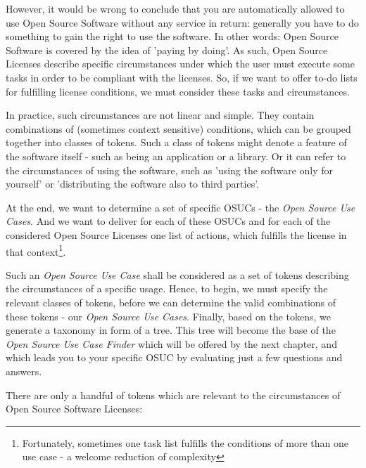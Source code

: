 However, it would be wrong to conclude that you are automatically allowed to use
Open Source Software without any service in return: generally you have to do
something to gain the right to use the software. In other words: Open Source
Software is covered by the idea of ’paying by doing’. As such, Open Source
Li\-cen\-ses describe specific circumstances under which the user must execute
some tasks in order to be compliant with the licenses. So, if we want to offer
to-do lists for fulfilling license conditions, we must consider these tasks and
circumstances.

In practice, such circumstances are not linear and simple. They contain
combinations of (sometimes context sensitive) conditions, which can be grouped
together into classes of tokens. Such a class of tokens might denote a feature
of the software itself - such as being an application or a library. Or it can
refer to the circumstances of using the software, such as 'using the software
only for yourself' or 'distributing the software also to third parties'.

At the end, we want to determine a set of specific OSUCs - the \emph{Open Source
Use Cases}. And we want to deliver for each of these OSUCs and for each of the
considered Open Source Licenses one list of actions, which fulfills the license
in that context\footnote{Fortunately, sometimes one task list fulfills the
conditions of more than one use case - a welcome reduction of complexity}.

Such an \emph{Open Source Use Case} shall be considered as a set of tokens
describing the circumstances of a specific usage. Hence, to begin, we must
specify the relevant classes of tokens, before we can determine the valid
combinations of these tokens - our \emph{Open Source Use Cases}. Finally, based
on the tokens, we generate a taxonomy in form of a tree. This tree will become
the base of the \emph{Open Source Use Case Finder} which will be offered by the
next chapter, and which leads you to your specific OSUC by evaluating just a few
questions and answers.

There are only a handful of tokens which are relevant to the circumstances of
Open Source Software Licenses:

